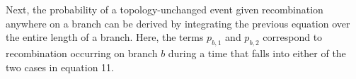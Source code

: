 \documentclass[11pt]{article}
\begin{document}


\noindent Next, the probability of a topology-unchanged event given recombination 
anywhere on a branch can be derived by integrating the previous equation 
over the entire length of a branch.
Here, the terms $p_{b,1}$ and $p_{b,2}$ correspond to recombination occurring
on branch $b$ during a time that falls into either of the two cases in equation 11.%

\end{document}
